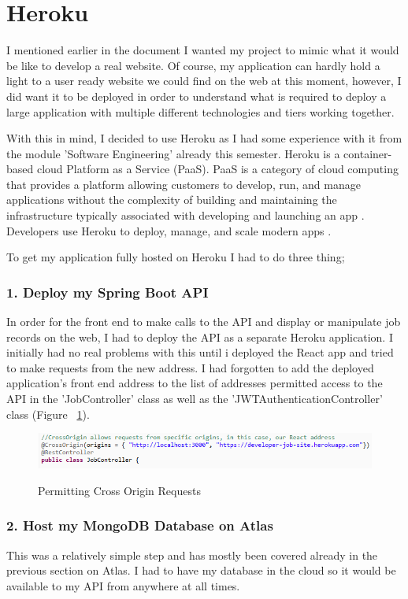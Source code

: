 \section{Heroku}
I mentioned earlier in the document I wanted my project to mimic what it would be like to develop a real website. Of course, my application can hardly hold a light to a user ready website we could find on the web at this moment, however, I did want it to be deployed in order to understand what is required to deploy a large application with multiple different technologies and tiers working together.

With this in mind, I decided to use Heroku as I had some experience with it from the module 'Software Engineering' already this semester.
Heroku is a container-based cloud Platform as a Service (PaaS). PaaS is a category of cloud computing that provides a platform allowing customers to develop, run, and manage applications without the complexity of building and maintaining the infrastructure typically associated with developing and launching an app \cite{wiki:paas}. Developers use Heroku to deploy, manage, and scale modern apps \cite{Heroku:about}.

To get my application fully hosted on Heroku I had to do three thing;
\subsubsection{1. Deploy my Spring Boot API}
In order for the front end to make calls to the API and display or manipulate job records on the web, I had to deploy the API as a separate Heroku application. I initially had no real problems with this until i deployed the React app and tried to make requests from the new address. I had forgotten to add the deployed application's front end address to the list of addresses permitted access to the API in the 'JobController' class as well as the 'JWTAuthenticationController' class (Figure ~\ref{heroku1_label}).

\begin{figure}[ht]
    \centering
    \includegraphics[scale=0.62]{Images/heroku1.png} 
    \label{heroku1_label}
    \caption{Permitting Cross Origin Requests}
\end{figure}

\subsubsection{2. Host my MongoDB Database on Atlas}
This was a relatively simple step and has mostly been covered already in the previous section on Atlas. I had to have my database in the cloud so it would be available to my API from anywhere at all times.
